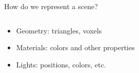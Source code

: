 \documentclass[10pt]{beamer}
\begin{document}
\begin{frame}{How do we represent a scene?}
  \begin{columns}
    \begin{column}{0.5\textwidth}
      \begin{itemize}[<+>]
        \item Geometry: triangles, voxels %
        \item Materials: colors and other properties %
        \item Lights: positions, colors, etc.
      \end{itemize}
    \end{column}
    \begin{column}{0.5\textwidth}


\end{column}
\end{columns}
\end{frame}
\end{document}
